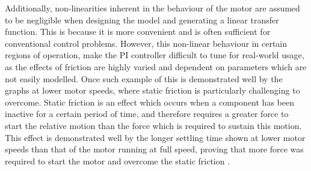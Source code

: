 \documentclass[11pt, onecolumn]{article}
\begin{document}
\par Additionally, non-linearities inherent in the behaviour of the motor are assumed to be negligible when designing the model and generating a linear transfer function. This is because it is more convenient and is often sufficient for conventional control problems. However, this non-linear behaviour in certain regions of operation, make the PI controller difficult to tune for real-world usage, as the effects of friction are highly varied and dependent on parameters which are not easily modelled. Once such example of this is demonstrated well by the graphs at lower motor speeds, where static friction is particularly challenging to overcome. Static friction is an effect which occurs when a component has been inactive for a certain period of time, and therefore requires a greater force to start the relative motion than the force which is required to sustain this motion. This effect is demonstrated well by the longer settling time shown at lower motor speeds than that of the motor running at full speed, proving that more force was required to start the motor and overcome the static friction \cite{ijsrpStudyNonlinear}.
\end{document}
